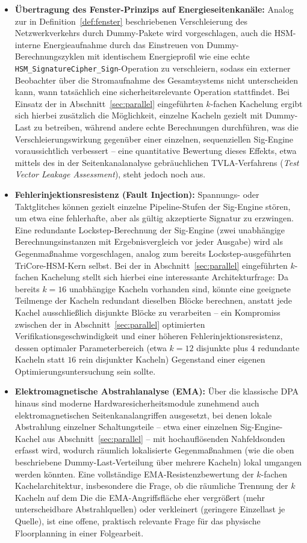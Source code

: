 ﻿\documentclass[a4paper,12pt]{article}
\theoremstyle{definition}
\begin{document}
\begin{itemize}
	\item \textbf{Übertragung des Fenster-Prinzips auf Energieseitenkanäle:} Analog zur in Definition~\ref{def:fenster} beschriebenen Verschleierung des Netzwerkverkehrs durch Dummy-Pakete wird vorgeschlagen, auch die HSM-interne Energieaufnahme durch das Einstreuen von Dummy-Berechnungszyklen mit identischem Energieprofil wie eine echte \texttt{HSM\_SignatureCipher\_Sign}-Operation zu verschleiern, sodass ein externer Beobachter über die Stromaufnahme des Gesamtsystems nicht unterscheiden kann, wann tatsächlich eine sicherheitsrelevante Operation stattfindet. Bei Einsatz der in Abschnitt~\ref{sec:parallel} eingeführten $k$-fachen Kachelung ergibt sich hierbei zusätzlich die Möglichkeit, einzelne Kacheln gezielt mit Dummy-Last zu betreiben, während andere echte Berechnungen durchführen, was die Verschleierungswirkung gegenüber einer einzelnen, sequenziellen Sig-Engine voraussichtlich verbessert -- eine quantitative Bewertung dieses Effekts, etwa mittels des in der Seitenkanalanalyse gebräuchlichen TVLA-Verfahrens (\emph{Test Vector Leakage Assessment}), steht jedoch noch aus.
	\item \textbf{Fehlerinjektionsresistenz (Fault Injection):} Spannungs- oder Taktglitches können gezielt einzelne Pipeline-Stufen der Sig-Engine stören, um etwa eine fehlerhafte, aber als gültig akzeptierte Signatur zu erzwingen. Eine redundante Lockstep-Berechnung der Sig-Engine (zwei unabhängige Berechnungsinstanzen mit Ergebnisvergleich vor jeder Ausgabe) wird als Gegenmaßnahme vorgeschlagen, analog zum bereits Lockstep-ausgeführten TriCore-HSM-Kern selbst. Bei der in Abschnitt~\ref{sec:parallel} eingeführten $k$-fachen Kachelung stellt sich hierbei eine interessante Architekturfrage: Da bereits $k=16$ unabhängige Kacheln vorhanden sind, könnte eine geeignete Teilmenge der Kacheln redundant dieselben Blöcke berechnen, anstatt jede Kachel ausschließlich disjunkte Blöcke zu verarbeiten -- ein Kompromiss zwischen der in Abschnitt~\ref{sec:parallel} optimierten Verifikationsgeschwindigkeit und einer höheren Fehlerinjektionsresistenz, dessen optimaler Parameterbereich (etwa $k=12$ disjunkte plus $4$ redundante Kacheln statt $16$ rein disjunkter Kacheln) Gegenstand einer eigenen Optimierungsuntersuchung sein sollte.
	\item \textbf{Elektromagnetische Abstrahlanalyse (EMA):} Über die klassische DPA hinaus sind moderne Hardwaresicherheitsmodule zunehmend auch elektromagnetischen Seitenkanalangriffen ausgesetzt, bei denen lokale Abstrahlung einzelner Schaltungsteile -- etwa einer einzelnen Sig-Engine-Kachel aus Abschnitt~\ref{sec:parallel} -- mit hochauflösenden Nahfeldsonden erfasst wird, wodurch räumlich lokalisierte Gegenmaßnahmen (wie die oben beschriebene Dummy-Last-Verteilung über mehrere Kacheln) lokal umgangen werden könnten. Eine vollständige EMA-Resistenzbewertung der $k$-fachen Kachelarchitektur, insbesondere die Frage, ob die räumliche Trennung der $k$ Kacheln auf dem Die die EMA-Angriffsfläche eher vergrößert (mehr unterscheidbare Abstrahlquellen) oder verkleinert (geringere Einzellast je Quelle), ist eine offene, praktisch relevante Frage für das physische Floorplanning in einer Folgearbeit.
\end{itemize}
\end{document}
